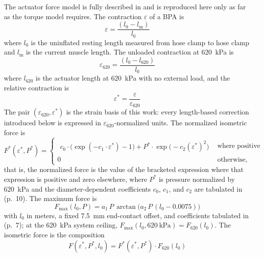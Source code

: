 \documentclass[utf8]{FrontiersinHarvard} %
\begin{document}
The actuator force model is fully described in \citet{bolen_2026} and is reproduced here only as far as the torque model requires. The contraction $\varepsilon$ of a BPA is
\begin{equation}
    {\varepsilon} = \frac{(l_{0}-l_\text{m})}{l_{0}} \label{eq:strain}
\end{equation}
where $l_{0}$ is the uninflated resting length measured from hose clamp to hose clamp and $l_\text{m}$ is the current muscle length. The unloaded contraction at \qty{620}{\kPa} is
\begin{equation}
    \varepsilon_{620} = \frac{(l_{0}-l_{620})}{l_{0}} \label{eq:max_strain}
\end{equation}
where $l_{620}$ is the actuator length at \qty{620}{\kPa} with no external load, and the relative contraction is
\begin{equation}
    \varepsilon^* = \frac{\varepsilon}{\varepsilon_{620}} \label{eq:rel_strain}
\end{equation}
The pair $(\varepsilon_{620}, \varepsilon^*)$ is the strain basis of this work: every length-based correction introduced below is expressed in $\varepsilon_{620}$-normalized units. The normalized isometric force is
\begin{equation}
F^*(\varepsilon^*,P^*)=
\begin{cases}
\begin{aligned}
c_0\cdot\bigl(\exp(-c_1 \cdot \varepsilon^*)-1\bigr)
+ P^*\cdot\exp\!\bigl(-c_2(\varepsilon^*)^{2}\bigr)
\end{aligned}
& \text{where positive}\\[10pt]
0
& \text{otherwise,}
\end{cases}\label{eq:Fstar}
\end{equation}
that is, the normalized force is the value of the bracketed expression where that expression is positive and zero elsewhere, where $P^*$ is pressure normalized by \qty{620}{\kPa} and the diameter-dependent coefficients $c_0$, $c_1$, and $c_2$ are tabulated in \citet{bolen_2026} (p.~10). The maximum force is
\begin{equation}
    F_{\mathrm{max}}(l_{0},P) = a_1 \, P \, \arctan\!\bigl(a_2 \, P \, (l_{0}-0.0075)\bigr) \label{eq:Fmax_3D}
\end{equation}
with $l_{0}$ in meters, a fixed \qty{7.5}{\mm} end-contact offset, and coefficients tabulated in \citet{bolen_2026} (p.~7); at the \qty{620}{\kPa} system ceiling, $F_{\mathrm{max}}(l_{0},\qty{620}{\kPa}) = F_{620}(l_{0})$. The isometric force is the composition
\begin{equation}
   F(\varepsilon^*,P^*,l_{0}) = F^*(\varepsilon^*,P^*) \cdot F_{620}(l_{0}) \label{eq:force}
\end{equation}
\end{document}
